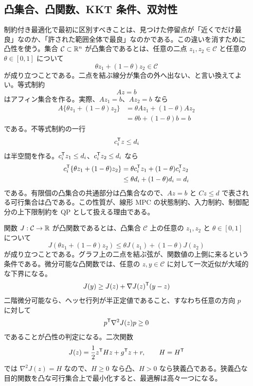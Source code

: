 \subsection{凸集合、凸関数、KKT 条件、双対性}

制約付き最適化で最初に区別すべきことは、見つけた停留点が「近くでだけ最良」なのか、「許された範囲全体で最良」なのかである。この違いを消すために凸性を使う。集合 $\mathcal{C}\subset\mathbb{R}^n$ が凸集合であるとは、任意の二点 $z_1,z_2\in\mathcal{C}$ と任意の $\theta\in[0,1]$ について
\begin{equation}
  \theta z_1+(1-\theta)z_2\in\mathcal{C}
\end{equation}
が成り立つことである。二点を結ぶ線分が集合の外へ出ない、と言い換えてよい。等式制約
\begin{equation}
  Az=b
\end{equation}
はアフィン集合を作る。実際、$Az_1=b$、$Az_2=b$ なら
\begin{align}
  A\{\theta z_1+(1-\theta)z_2\}
  &=\theta Az_1+(1-\theta)Az_2\\
  &=\theta b+(1-\theta)b=b
\end{align}
である。不等式制約の一行
\begin{equation}
  c_i^{\mathsf{T}} z\le d_i
\end{equation}
は半空間を作る。$c_i^{\mathsf{T}} z_1\le d_i$、$c_i^{\mathsf{T}} z_2\le d_i$ なら
\begin{align}
  c_i^{\mathsf{T}}\{\theta z_1+(1-\theta)z_2\}
  &=\theta c_i^{\mathsf{T}} z_1+(1-\theta)c_i^{\mathsf{T}} z_2\\
  &\le\theta d_i+(1-\theta)d_i=d_i
\end{align}
である。有限個の凸集合の共通部分は凸集合なので、$Az=b$ と $Cz\le d$ で表される可行集合は凸である。この性質が、線形 MPC の状態制約、入力制約、制御配分の上下限制約を QP として扱える理由である。

関数 $J:\mathcal{C}\to\mathbb{R}$ が凸関数であるとは、凸集合 $\mathcal{C}$ 上の任意の $z_1,z_2$ と $\theta\in[0,1]$ について
\begin{equation}
  J(\theta z_1+(1-\theta)z_2)
  \le
  \theta J(z_1)+(1-\theta)J(z_2)
\end{equation}
が成り立つことである。グラフ上の二点を結ぶ弦が、関数値の上側に来るという条件である。微分可能な凸関数では、任意の $z,y\in\mathcal{C}$ に対して一次近似が大域的な下界になる。
\begin{equation}
  J(y)\ge J(z)+\nabla J(z)^{\mathsf{T}}(y-z)
\end{equation}
二階微分可能なら、ヘッセ行列が半正定値であること、すなわち任意の方向 $p$ に対して
\begin{equation}
  p^{\mathsf{T}}\nabla^2J(z)p\ge0
\end{equation}
であることが凸性の判定になる。二次関数
\begin{equation}
  J(z)=\frac{1}{2}z^{\mathsf{T}} Hz+g^{\mathsf{T}} z+r,
  \qquad H=H^{\mathsf{T}}
\end{equation}
では $\nabla^2J(z)=H$ なので、$H\ge0$ なら凸、$H>0$ なら狭義凸である。狭義凸な目的関数を凸な可行集合上で最小化すると、最適解は高々一つになる。

